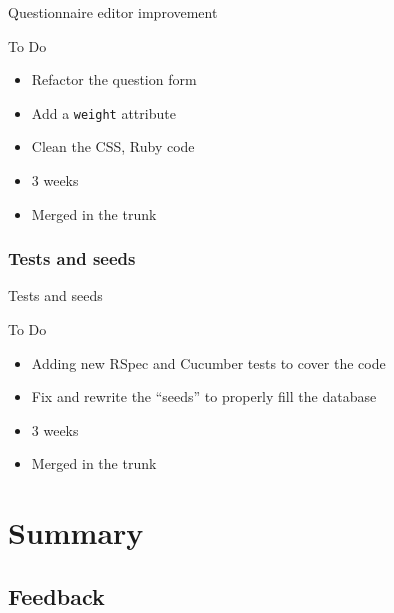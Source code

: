 \documentclass[10pt,a4paper]{beamer}
\begin{document}
\begin{frame}{Questionnaire editor improvement}
  \begin{block}{To Do}
    \begin{itemize}
      \item Refactor the question form
      \item Add a \texttt{weight} attribute
      \item Clean the CSS, Ruby code
    \end{itemize}
  \end{block}
  
  \begin{block}{}
    \begin{itemize}
      \item 3 weeks
      \item Merged in the trunk
    \end{itemize}
  \end{block}
\end{frame}

\subsubsection{Tests and seeds}

\begin{frame}{Tests and seeds}
  \begin{block}{To Do}
    \begin{itemize}
      \item Adding new RSpec and Cucumber tests to cover the code
      \item Fix and rewrite the ``seeds'' to properly fill the database
    \end{itemize}
  \end{block}
  
  \begin{block}{}
    \begin{itemize}
      \item 3 weeks
      \item Merged in the trunk
    \end{itemize}
  \end{block}
\end{frame}

\section{Summary}

\subsection{Feedback}
\end{document}

